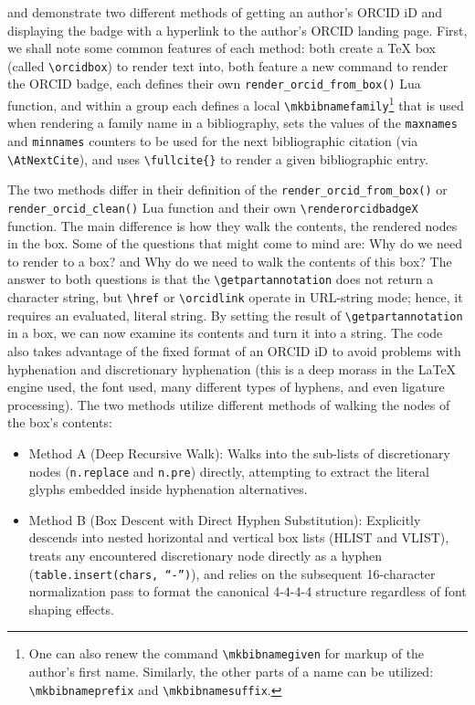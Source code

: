 \documentclass[12pt, twoside]{article}
\begin{document}
 and  demonstrate two different methods of getting an author's ORCID iD and displaying the badge with a hyperlink to the author's \gls{ORCID} landing page. First, we shall note some common features of each method:
both create a \TeX{} box (called \texttt{\textbackslash orcidbox}) to render text into, both feature a new command to render the \gls{ORCID} badge, each defines their own \texttt{render\_orcid\_from\_box()} Lua function, and within a group \first each defines a local \texttt{\textbackslash mkbibnamefamily}\footnote{One can also renew the command \texttt{\textbackslash mkbibnamegiven} for markup of the author's first name. Similarly, the other parts of a name can be utilized: \texttt{\textbackslash mkbibnameprefix} and
\texttt{\textbackslash mkbibnamesuffix}.} that is used when rendering a family name in a bibliography, \Second sets the values of the \texttt{maxnames} and \texttt{minnames} counters to be used for the next bibliographic citation (via 
\texttt{\textbackslash AtNextCite}), and \third uses \texttt{\textbackslash fullcite\{\}} to render a given bibliographic entry.

The two methods differ in their definition of the \texttt{render\_orcid\_from\_box()} or \texttt{render\_orcid\_clean()} Lua function and their own \texttt{\textbackslash renderorcidbadgeX} function. The main difference is how they walk the contents, \ie the rendered nodes in the box. Some of the questions that might come to mind are: Why do we need to render to a box? and Why do we need to walk the contents of this box? The answer to both questions is that the \texttt{\textbackslash getpartannotation} does not return a character string, but \texttt{\textbackslash href} or \texttt{\textbackslash orcidlink} operate in URL-string mode; hence, it requires an evaluated, literal string. By setting the result of \texttt{\textbackslash getpartannotation} in a box, we can now examine its contents and turn it into a string. The code also takes advantage of the fixed format of an ORCID iD to avoid problems with hyphenation and discretionary hyphenation (this is a deep morass in the \LaTeX{} engine used, the font used, many different types of hyphens, and even ligature processing). The two methods utilize different methods of walking the nodes of the box's contents:
\begin{itemize}
    \item Method A (Deep Recursive Walk): Walks into the sub-lists of discretionary nodes (\texttt{n.replace} and \texttt{n.pre}) directly, attempting to extract the literal glyphs embedded inside hyphenation alternatives.

    \item Method B (Box Descent with Direct Hyphen Substitution): Explicitly descends into nested horizontal and vertical box lists (HLIST and VLIST), treats any encountered discretionary node directly as a hyphen (\texttt{table.insert(chars, \enquote{-})}), and relies on the subsequent 16-character normalization pass to format the canonical 4-4-4-4 structure regardless of font shaping effects.
\end{itemize}
\end{document}
